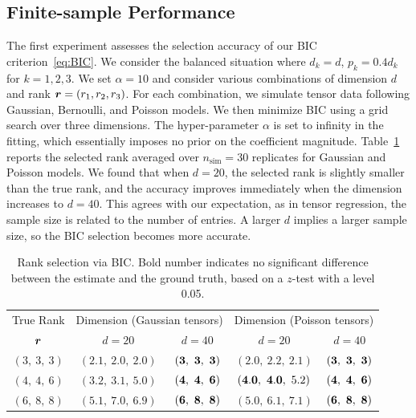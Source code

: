 \documentclass[12pt]{article}
\theoremstyle{plain}
\theoremstyle{definition}
\begin{document}
\subsection{Finite-sample Performance}

The first experiment assesses the selection accuracy of our BIC criterion~\eqref{eq:BIC}. We consider the balanced situation where $d_k=d$, $p_k=0.4d_k$ for $k=1,2,3$. We set $\alpha=10$ and consider various combinations of dimension $d$ and rank $\bm{r}=(r_1,r_2,r_3)$. For each combination, we simulate tensor data following Gaussian, Bernoulli, and Poisson models. We then minimize BIC using a grid search over three dimensions. The hyper-parameter $\alpha$ is set to infinity in the fitting, which essentially imposes no prior on the coefficient magnitude. Table~\ref{tab:rank} reports the selected rank averaged over $n_{\text{sim}}=30$ replicates for Gaussian and Poisson models. We found that when $d=20$, the selected rank is slightly smaller than the true rank, and the accuracy improves immediately when the dimension increases to $d=40$. This agrees with our expectation, as in tensor regression, the sample size is related to the number of entries. A larger $d$ implies a larger sample size, so the BIC selection becomes more accurate. 


\begin{table}[tb]
\centering
\begin{tabular}{|c|cc|cc|}
\hline
True Rank &\multicolumn{2}{c|}{Dimension (Gaussian tensors)}&\multicolumn{2}{c|}{Dimension (Poisson tensors)}\\
$\bm{r}$& $d=20$  &$d=40$&$d=20$ &$d=40$\\
\hline
$(3,\ 3,\ 3)$&$(2.1,\ 2.0,\ 2.0)$&$({\bf 3},\ {\bf 3},\ {\bf 3})$&$(2.0,\ 2.2,\ 2.1)$&$({\bf 3},\ {\bf 3},\ {\bf 3})$\\
$(4,\ 4,\ 6)$&$(3.2,\ 3.1,\ 5.0)$&$({\bf 4},\ {\bf 4},\ {\bf 6})$&$({\bf 4.0},\ {\bf 4.0},\ 5.2)$&$({\bf 4},\ {\bf 4},\ {\bf 6})$\\
$(6,\ 8,\ 8)$&$(5.1,\ 7.0,\ 6.9)$&$({\bf 6},\ {\bf 8},\ {\bf 8})$&$(5.0,\ 6.1,\ 7.1)$&$({\bf 6},\ {\bf 8},\ {\bf 8})$\\
\hline
\end{tabular}
\caption{Rank selection via BIC. Bold number indicates no significant difference between the estimate and the ground truth, based on a $z$-test with a level 0.05.}\label{tab:rank}
\end{table}
\end{document}
